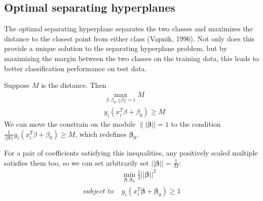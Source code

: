 \documentclass[12pt, letterpaper]{article}
\theoremstyle{definition}
\newcommand{\be}{\mathbf{\beta}}
\begin{document}
\subsection{Optimal separating hyperplanes}
\label{OSH}
The optimal separating hyperplane separates the two classes and maximizes the distance to the closest point from either class (Vapnik, 1996). Not only does this provide a unique solution to the separating hyperplane problem, but by maximizing the margin between the two classes on the training data, this leads to better classification performance on test data.

Suppose $M$ is the distance. Then
\begin{equation}
\begin{aligned}
&\max\limits_{\beta,\beta_0, ||\beta||=1} M \\
& y_i(x_i^T\beta + \beta_0) \ge M
\end{aligned}
\end{equation}
We  can move the constrain on the module $\||\be||=1$ to the condition $\frac{1}{||\be||}y_i(x_i^T\beta + \beta_0) \ge M$, which redefines $\be_0$. 

For a pair of coefficients satisfying this inequalities, any positively scaled multiple satisfies them too, so we can set arbitrarily set $||\be||=\frac{1}{M}$:
\begin{equation}
\begin{aligned}
&\min_{\be, \be_0}{\frac{1}{2}||\be||^2}\\
\textit{subject to } &y_i(x_i^T\be+\be_0)\ge1
\end{aligned}
\end{equation}
\end{document}
